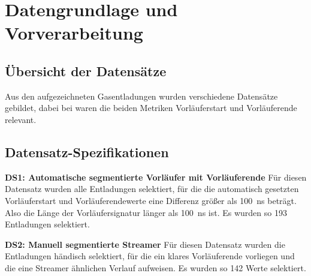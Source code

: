 \section{Datengrundlage und Vorverarbeitung}
\subsection{Übersicht der Datensätze}
Aus den aufgezeichneten Gasentladungen wurden verschiedene Datensätze gebildet, dabei bei waren die beiden Metriken Vorläuferstart und Vorläuferende relevant.

\begin{table}[h!]
\centering
\caption{Übersicht der verwendeten Datensätze}
\end{table}

\subsection{Datensatz-Spezifikationen}

\textbf{DS1: Automatische segmentierte Vorläufer mit Vorläuferende}\newline
Für diesen Datensatz wurden alle Entladungen selektiert, für die die automatisch gesetzten Vorläuferstart und Vorläuferendewerte eine Differenz größer als \SI{100}{\nano\second} beträgt. Also die Länge der Vorläufersignatur länger als \SI{100}{\nano\second} ist. Es wurden so 193 Entladungen selektiert.

\textbf{DS2: Manuell segmentierte Streamer}\newline
Für diesen Datensatz wurden die Entladungen händisch selektiert, für die ein klares Vorläuferende vorliegen und die eine Streamer ähnlichen Verlauf aufweisen. Es wurden so 142 Werte selektiert.

